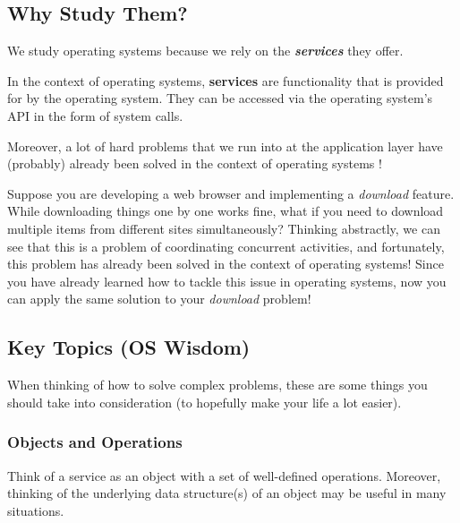 \documentclass{article}
\begin{document}
\subsection{Why Study Them?}
We study operating systems because we rely on the \textit{\textbf{services}} they offer.

\begin{tcolorbox}[title=Definition: Services]
  In the context of operating systems, \textbf{services} are functionality that is provided
  for by the operating system. They can be accessed via the operating system's API in the form of
  system calls. 
\end{tcolorbox}

Moreover, a lot of hard problems that we run into at the application layer have (probably) already
been solved in the context of operating systems !

\begin{tcolorbox}[colback=blue!5!white,colframe=black!75!blue,title=Example: Difficult Downloads]
  Suppose you are developing a web browser and implementing a \textit{download} feature. While
  downloading things one by one works fine, what if you need to download multiple items from different
  sites simultaneously? Thinking abstractly, we can see that this is a problem of coordinating
  concurrent activities, and fortunately, this problem has already been solved in the context of
  operating systems! Since you have already learned how to tackle this issue in operating systems, now
  you can apply the same solution to your \textit{download} problem!
\end{tcolorbox}


\subsection{Key Topics (OS Wisdom)}
When thinking of how to solve complex problems, these are some things you should take into
consideration (to hopefully make your life a lot easier).


\subsubsection*{Objects and Operations}
Think of a service as an object with a set of well-defined operations. Moreover, thinking of the
underlying data structure(s) of an object may be useful in many situations.  
\end{document}
